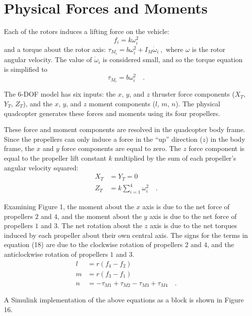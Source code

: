 \section*{Physical Forces and Moments}

Each of the rotors induces a lifting force on the vehicle:
\begin{equation}
    f_{i} = k \omega_i^2
\end{equation}
and a torque about the rotor axis: $\tau_{M_{i}} = b \omega_i^2 + I_M \dot{\omega}_i ~,$ where $\omega$ is the rotor angular velocity. The value of $\dot{\omega}_i$ is considered small, and so the torque equation is simplified to 
\begin{equation}
    \tau_{M_{i}} = b \omega_i^2 \quad .
\end{equation}

The 6-DOF model has six inputs: the $x$, $y$, and $z$ thruster force components ($X_T$, $Y_T$, $Z_T$), and the $x$, $y$, and $z$ moment components ($l$, $m$, $n$). The physical quadcopter generates these forces and moments using its four propellers.

These force and moment components are resolved in the quadcopter body frame. Since the propellers can only induce a force in the ``up'' direction ($z$) in the body frame, the $x$ and $y$ force components are equal to zero. The $z$ force component is equal to the propeller lift constant $k$ multiplied by the sum of each propeller's angular velocity squared:
\begin{align}
    X_T &= Y_T = 0 \\
    Z_T &= k\sum_{i=1}^{4}\omega_i^2 \quad .
\end{align}

Examining Figure 1, the moment about the $x$ axis is due to the net force of propellers $2$ and $4$, and the moment about the $y$ axis is due to the net force of propellers $1$ and $3$. The net rotation about the $z$ axis is due to the net torques induced by each propeller about their own central axis. The signs for the terms in equation (18) are due to the clockwise rotation of propellers $2$ and $4$, and the anticlockwise rotation of propellers $1$ and $3$.
\begin{align}
    l &= r(f_4 - f_2) \\
    m &= r(f_3 - f_1) \\
    n &= -\tau_{M1} + \tau_{M2} - \tau_{M3} + \tau_{M4} \quad .
\end{align}

A Simulink implementation of the above equations as a block is shown in Figure 16.